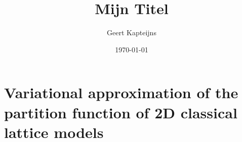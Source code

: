 \documentclass[10pt, ebook, openany, oneside]{memoir}
\begin{document}
\pagestyle{simple}

\frontmatter

\title{Mijn Titel}
\author{Geert Kapteijns}
\date{\today}


\tableofcontents

\mainmatter

\chapter{Variational approximation of the partition function of 2D classical lattice models}


%



%


\backmatter
\printbibliography
\end{document}
